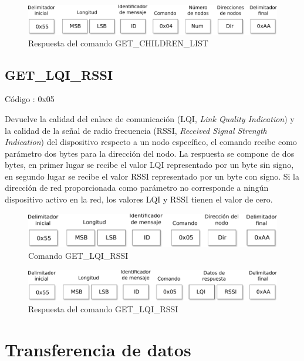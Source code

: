 \begin{figure}[h]
	\centering 
	\includegraphics[scale=0.7]{capitulo_3_imgs/res_children_list.pdf}
	\caption{Respuesta del comando GET\_CHILDREN\_LIST}
	\label{fig:res_children_list}
\end{figure}

\subsection{GET\_LQI\_RSSI}

Código : 0x05

Devuelve la calidad del enlace de comunicación (LQI, \textit{Link Quality Indication}) y la calidad de la señal de radio frecuencia (RSSI, \textit{Received Signal Strength Indication}) del dispositivo respecto a un nodo específico, el comando recibe como parámetro dos bytes para la dirección del nodo. La respuesta se compone de dos bytes, en primer lugar se recibe el valor LQI representado por un byte sin signo, en segundo lugar se recibe el valor RSSI representado por un byte con signo. Si la dirección de red proporcionada como parámetro no corresponde a ningún dispositivo activo en la red, los valores LQI y RSSI tienen el valor de cero. 

\begin{figure}[h]
	\centering 
	\includegraphics[scale=0.7]{capitulo_3_imgs/cmd_lqi_rssi.pdf}
	\caption{Comando GET\_LQI\_RSSI}
	\label{fig:cmd_lqi_rssi}
\end{figure}

\begin{figure}[h]
	\centering 
	\includegraphics[scale=0.7]{capitulo_3_imgs/res_lqi_rssi.pdf}
	\caption{Respuesta del comando GET\_LQI\_RSSI}
	\label{fig:cmd_children_list}
\end{figure}

\section{Transferencia de datos}

